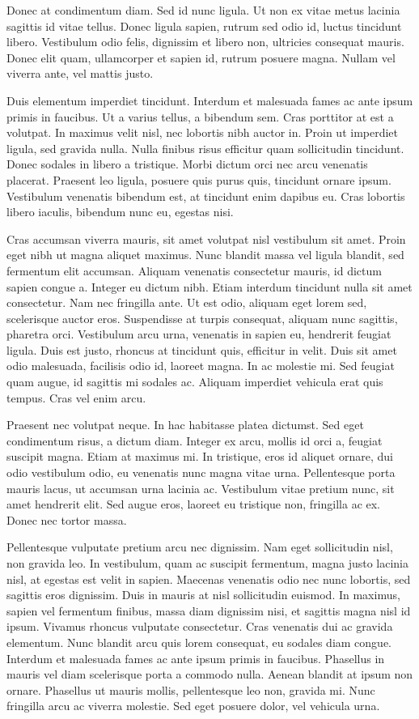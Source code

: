 Donec at condimentum diam. Sed id nunc ligula. Ut non ex vitae metus lacinia sagittis id vitae tellus. Donec ligula sapien, rutrum sed odio id, luctus tincidunt libero. Vestibulum odio felis, dignissim et libero non, ultricies consequat mauris. Donec elit quam, ullamcorper et sapien id, rutrum posuere magna. Nullam vel viverra ante, vel mattis justo.

Duis elementum imperdiet tincidunt. Interdum et malesuada fames ac ante ipsum primis in faucibus. Ut a varius tellus, a bibendum sem. Cras porttitor at est a volutpat. In maximus velit nisl, nec lobortis nibh auctor in. Proin ut imperdiet ligula, sed gravida nulla. Nulla finibus risus efficitur quam sollicitudin tincidunt. Donec sodales in libero a tristique. Morbi dictum orci nec arcu venenatis placerat. Praesent leo ligula, posuere quis purus quis, tincidunt ornare ipsum. Vestibulum venenatis bibendum est, at tincidunt enim dapibus eu. Cras lobortis libero iaculis, bibendum nunc eu, egestas nisi.

Cras accumsan viverra mauris, sit amet volutpat nisl vestibulum sit amet. Proin eget nibh ut magna aliquet maximus. Nunc blandit massa vel ligula blandit, sed fermentum elit accumsan. Aliquam venenatis consectetur mauris, id dictum sapien congue a. Integer eu dictum nibh. Etiam interdum tincidunt nulla sit amet consectetur. Nam nec fringilla ante. Ut est odio, aliquam eget lorem sed, scelerisque auctor eros. Suspendisse at turpis consequat, aliquam nunc sagittis, pharetra orci. Vestibulum arcu urna, venenatis in sapien eu, hendrerit feugiat ligula. Duis est justo, rhoncus at tincidunt quis, efficitur in velit. Duis sit amet odio malesuada, facilisis odio id, laoreet magna. In ac molestie mi. Sed feugiat quam augue, id sagittis mi sodales ac. Aliquam imperdiet vehicula erat quis tempus. Cras vel enim arcu.

Praesent nec volutpat neque. In hac habitasse platea dictumst. Sed eget condimentum risus, a dictum diam. Integer ex arcu, mollis id orci a, feugiat suscipit magna. Etiam at maximus mi. In tristique, eros id aliquet ornare, dui odio vestibulum odio, eu venenatis nunc magna vitae urna. Pellentesque porta mauris lacus, ut accumsan urna lacinia ac. Vestibulum vitae pretium nunc, sit amet hendrerit elit. Sed augue eros, laoreet eu tristique non, fringilla ac ex. Donec nec tortor massa.

Pellentesque vulputate pretium arcu nec dignissim. Nam eget sollicitudin nisl, non gravida leo. In vestibulum, quam ac suscipit fermentum, magna justo lacinia nisl, at egestas est velit in sapien. Maecenas venenatis odio nec nunc lobortis, sed sagittis eros dignissim. Duis in mauris at nisl sollicitudin euismod. In maximus, sapien vel fermentum finibus, massa diam dignissim nisi, et sagittis magna nisl id ipsum. Vivamus rhoncus vulputate consectetur. Cras venenatis dui ac gravida elementum. Nunc blandit arcu quis lorem consequat, eu sodales diam congue. Interdum et malesuada fames ac ante ipsum primis in faucibus. Phasellus in mauris vel diam scelerisque porta a commodo nulla. Aenean blandit at ipsum non ornare. Phasellus ut mauris mollis, pellentesque leo non, gravida mi. Nunc fringilla arcu ac viverra molestie. Sed eget posuere dolor, vel vehicula urna.

